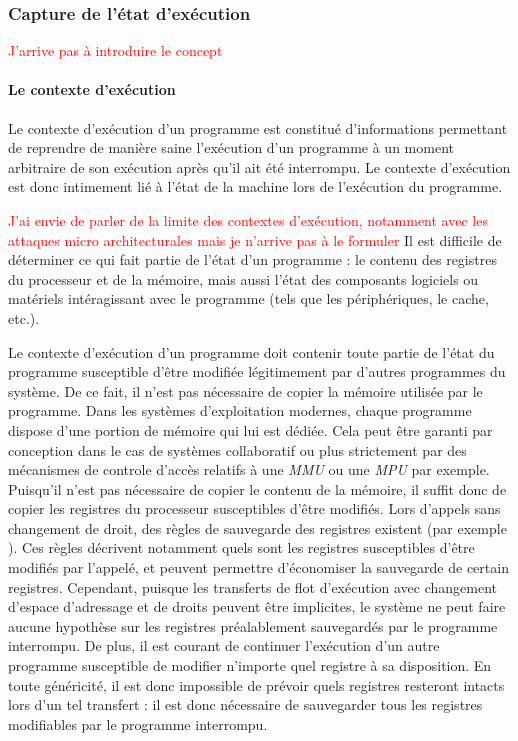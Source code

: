 
			\subsubsection{Capture de l'état d'exécution}

\label{context}
\textcolor{red}{J'arrive pas à introduire le concept}

\paragraph{Le contexte d'exécution}

Le contexte d'exécution d'un programme est constitué d'informations permettant de reprendre de manière saine l'exécution d'un programme à un moment arbitraire de son exécution après qu'il ait été interrompu. Le contexte d'exécution est donc intimement lié à l'état de la machine lors de l'exécution du programme. 

\textcolor{red}{J'ai envie de parler de la limite des contextes d'exécution, notamment avec les attaques micro architecturales mais je n'arrive pas à le formuler} Il est difficile de déterminer ce qui fait partie de l'état d'un programme : le contenu des registres du processeur et de la mémoire, mais aussi l'état des composants logiciels ou matériels intéragissant avec le programme (tels que les périphériques, le cache, etc.).

Le contexte d'exécution d'un programme doit contenir toute partie de l'état du programme susceptible d'être modifiée légitimement par d'autres programmes du système. De ce fait, il n'est pas nécessaire de copier la mémoire utilisée par le programme. Dans les systèmes d'exploitation modernes, chaque programme dispose d'une portion de mémoire qui lui est dédiée. Cela peut être garanti par conception dans le cas de systèmes collaboratif ou plus strictement par des mécanismes de controle d'accès relatifs à une \emph{MMU} ou une \emph{MPU} par exemple. 
Puisqu'il n'est pas nécessaire de copier le contenu de la mémoire, il suffit donc de copier les registres du processeur susceptibles d'être modifiés. Lors d'appels sans changement de droit, des règles de sauvegarde des registres existent (par exemple \cite{arm32_bit_callconv}). Ces règles décrivent notamment quels sont les registres susceptibles d'être modifiés par l'appelé, et peuvent permettre d'économiser la sauvegarde de certain registres.
Cependant, puisque les transferts de flot d'exécution avec changement d'espace d'adressage et de droits peuvent être implicites, le système ne peut faire aucune hypothèse sur les registres préalablement sauvegardés par le programme interrompu. De plus, il est courant de continuer l'exécution d'un autre programme susceptible de modifier n'importe quel registre à sa disposition. En toute généricité, il est donc impossible de prévoir quels registres resteront intacts lors d'un tel transfert : il est donc nécessaire de sauvegarder tous les registres modifiables par le programme interrompu.

